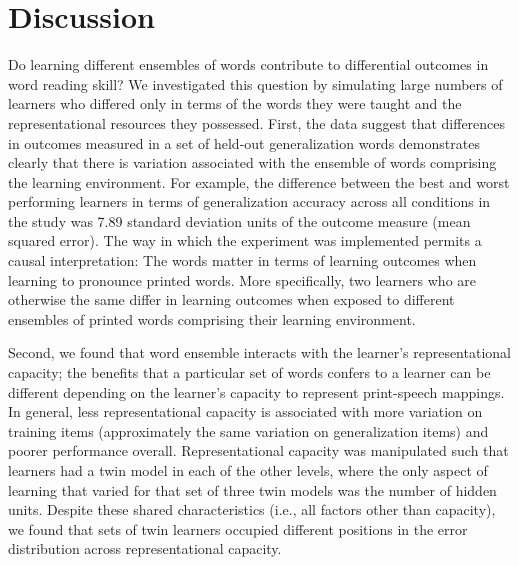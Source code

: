 \documentclass[
  ,man,floatsintext]{apa6}
\begin{document}
\section{Discussion}\label{discussion}

Do learning different ensembles of words contribute to differential outcomes in word reading skill? We investigated this question by simulating large numbers of learners who differed only in terms of the words they were taught and the representational resources they possessed. First, the data suggest that differences in outcomes measured in a set of held-out generalization words demonstrates clearly that there is variation associated with the ensemble of words comprising the learning environment. For example, the difference between the best and worst performing learners in terms of generalization accuracy across all conditions in the study was 7.89 standard deviation units of the outcome measure (mean squared error). The way in which the experiment was implemented permits a causal interpretation: The words matter in terms of learning outcomes when learning to pronounce printed words. More specifically, two learners who are otherwise the same differ in learning outcomes when exposed to different ensembles of printed words comprising their learning environment.

Second, we found that word ensemble interacts with the learner's representational capacity; the benefits that a particular set of words confers to a learner can be different depending on the learner's capacity to represent print-speech mappings. In general, less representational capacity is associated with more variation on training items (approximately the same variation on generalization items) and poorer performance overall. Representational capacity was manipulated such that learners had a twin model in each of the other levels, where the only aspect of learning that varied for that set of three twin models was the number of hidden units. Despite these shared characteristics (i.e., all factors other than capacity), we found that sets of twin learners occupied different positions in the error distribution across representational capacity.
\end{document}
